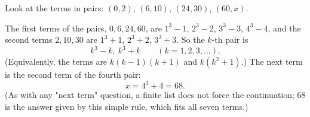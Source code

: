 Look at the terms in pairs: $(0,2)$, $(6,10)$, $(24,30)$, $(60,x)$.

The first terms of the pairs, $0,6,24,60$, are $1^3-1$, $2^3-2$, $3^3-3$, $4^3-4$, and the second terms $2,10,30$ are $1^3+1$, $2^3+2$, $3^3+3$. So the $k$-th pair is
\[
k^3-k,\ k^3+k\qquad(k=1,2,3,\dots).
\]
(Equivalently, the terms are $k(k-1)(k+1)$ and $k(k^2+1)$.) The next term is the second term of the fourth pair:
\[
x=4^3+4=\boxed{68}.
\]
(As with any "next term" question, a finite list does not force the continuation; $68$ is the answer given by this simple rule, which fits all seven terms.)
